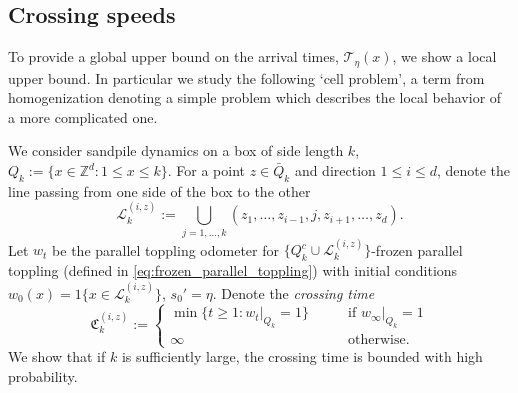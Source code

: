 \documentclass[aap]{imsart}
\newcommand{\Z}{\mathbb{Z}}
\begin{document}
\subsection{Crossing speeds}
To provide a global upper bound on the arrival times, $\mathcal{T}_{\eta}(x)$, we show a local upper bound. In particular 
we study the following `cell problem', a term from homogenization denoting 
a simple problem which describes the local behavior of a more complicated one. 

We consider sandpile dynamics on a box of side length $k$, $Q_k := \{x \in \Z^d : 1 \leq x \leq k\}$. For a point $z \in \bar{Q}_k$ and direction $1 \leq i \leq d$, denote the line passing from one side of the
box to the other 
\begin{equation}
\mathcal{L}_k^{(i,z)} := \bigcup_{j=1,\ldots,k} (z_1, \ldots, z_{i-1}, j, z_{i+1}, \ldots, z_d).
\end{equation}
Let $w_t$ be the parallel toppling odometer for $\{Q_k^c \cup \mathcal{L}_k^{(i,z)}\}$-frozen parallel toppling (defined in \eqref{eq:frozen_parallel_toppling})
with initial conditions $w_0(x) = 1\{x \in \mathcal{L}_k^{(i,z)}\}$, $s_0' = \eta$. Denote the {\it crossing time}
\begin{equation}
\mathfrak{C}_{k}^{(i,z)} := 
\begin{cases}
 \min \{ t \geq 1 : w_t|_{Q_k} = 1 \} \qquad &\mbox{if $w_{\infty} |_{Q_k} = 1$}  \\
 \infty \qquad &\mbox{otherwise}.
 \end{cases}
\end{equation}
We show that if $k$ is sufficiently large, the crossing time is bounded with high probability.
\end{document}
